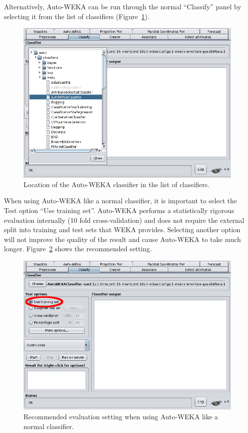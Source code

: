 \documentclass{article}
\begin{document}
Alternatively, Auto-WEKA can be run through the normal ``Classify'' panel by
selecting it from the list of classifiers (Figure~\ref{fig:classifier}).

\begin{figure}[!ht]
\begin{center}
\includegraphics[width=\textwidth]{classifier}
\caption{Location of the Auto-WEKA classifier in the list of classifiers.}
\label{fig:classifier}
\end{center}
\end{figure}

When using Auto-WEKA like a normal classifier, it is important to select the
Test option ``Use training set''. Auto-WEKA performs a statistically rigorous
evaluation internally (10 fold cross-validation) and does not require the
external split into training and test sets that WEKA provides. Selecting another
option will not improve the quality of the result and cause Auto-WEKA to take
much longer. Figure~\ref{fig:train} shows the recommended setting.

\begin{figure}[!ht]
\begin{center}
\includegraphics[width=\textwidth]{train}
\caption{Recommended evaluation setting when using Auto-WEKA like a normal
classifier.}
\label{fig:train}
\end{center}
\end{figure}
\end{document}
